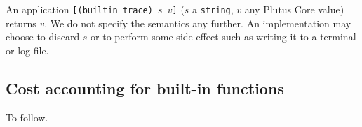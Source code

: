 \label{note:trace}
An application \texttt{[(builtin trace) $s$ $v$]} ($s$ a \texttt{string}, $v$
any Plutus Core value) returns $v$.  We do not specify the semantics any
further.  An implementation may choose to discard $s$ or to perform some
side-effect such as writing it to a terminal or log file.


\subsection{Cost accounting for built-in functions}
To follow.

\newpage
